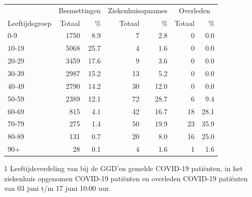 \documentclass[
  english,
  man,floatsintext]{apa6}
\begin{document}
\begin{table}
\centering\begingroup\fontsize{11}{13}\selectfont

\begin{threeparttable}
\begin{tabular}{lrrrrrr}
\toprule
\multicolumn{1}{c}{ } & \multicolumn{2}{c}{Besmettingen} & \multicolumn{2}{c}{Ziekenhuisopnames} & \multicolumn{2}{c}{Overleden} \\
\cmidrule(l{3pt}r{3pt}){2-3} \cmidrule(l{3pt}r{3pt}){4-5} \cmidrule(l{3pt}r{3pt}){6-7}
Leeftijdsgroep & Totaal & \% & Totaal & \% & Totaal & \%\\
\midrule
0-9 & 1750 & 8.9 & 7 & 2.8 & 0 & 0.0\\
10-19 & 5068 & 25.7 & 4 & 1.6 & 0 & 0.0\\
20-29 & 3459 & 17.6 & 9 & 3.6 & 0 & 0.0\\
30-39 & 2987 & 15.2 & 13 & 5.2 & 0 & 0.0\\
40-49 & 2790 & 14.2 & 30 & 12.0 & 0 & 0.0\\
50-59 & 2389 & 12.1 & 72 & 28.7 & 6 & 9.4\\
60-69 & 815 & 4.1 & 42 & 16.7 & 18 & 28.1\\
70-79 & 275 & 1.4 & 50 & 19.9 & 23 & 35.9\\
80-89 & 131 & 0.7 & 20 & 8.0 & 16 & 25.0\\
90+ & 28 & 0.1 & 4 & 1.6 & 1 & 1.6\\
\bottomrule
\end{tabular}
\begin{tablenotes}
\item[1] Leeftijdsverdeling van bij de GGD’en gemelde COVID-19 patiënten, in het ziekenhuis opgenomen COVID-19 patiënten en overleden COVID-19 patiënten van 03 juni t/m 17 juni 10:00 uur.
\end{tablenotes}
\end{threeparttable}
\endgroup{}
\end{table}

\newpage
\end{document}
